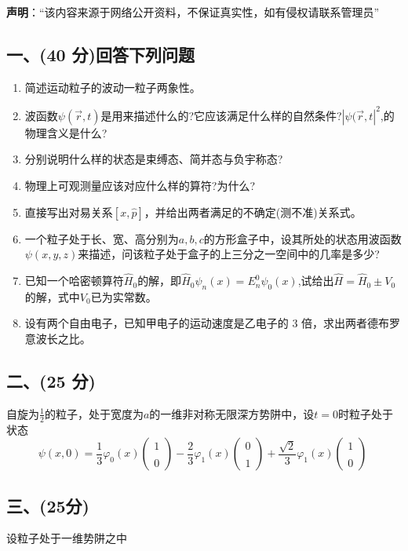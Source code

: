 
\textbf{声明}：“该内容来源于网络公开资料，不保证真实性，如有侵权请联系管理员”

\subsection{一、(40 分)回答下列问题}
\begin{enumerate}
\item 简述运动粒子的波动一粒子两象性。
\item 波函数$\psi(\vec{r},t)$是用来描述什么的?它应该满足什么样的自然条件?$|\psi(\vec{r},t|^2$,的物理含义是什么?
\item 分别说明什么样的状态是束缚态、简并态与负宇称态?
\item 物理上可观测量应该对应什么样的算符?为什么?
\item 直接写出对易关系$[x,\hat{p}]$，并给出两者满足的不确定(测不准)关系式。
\item 一个粒子处于长、宽、高分别为$a,b,c$的方形盒子中，设其所处的状态用波函数$\psi(x,y,z)$来描述，问该粒子处于盒子的上三分之一空间中的几率是多少?
\item 已知一个哈密顿算符$\hat{H}_0$的解，即$\hat{H}_0\psi_n(x)=E^0_n\psi_0(x)$,试给出$\hat{H}=\hat{H}_0\pm V_0$的解，式中$V_0$已为实常数。
\item 设有两个自由电子，已知甲电子的运动速度是乙电子的 3 倍，求出两者德布罗意波长之比。
\end{enumerate}
\subsection{二、(25 分)}
自旋为$\frac{1}{2}$的粒子，处于宽度为$a$的一维非对称无限深方势阱中，设$t=0$时粒子处于状态
$$\psi(x,0) = \frac{1}{3} \varphi_0(x) 
\begin{pmatrix}
1 \\\\
0
\end{pmatrix}
-\frac{2}{3} \varphi_1(x) 
\begin{pmatrix}
0 \\\\
1
\end{pmatrix}
+ \frac{\sqrt{2}}{3} \varphi_1(x)
\begin{pmatrix}
1 \\\\
0
\end{pmatrix}~$$
\subsection{三、(25分)}
设粒子处于一维势阱之中

